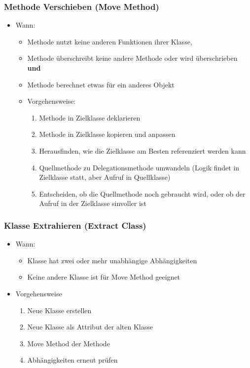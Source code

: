 \documentclass[
    ngerman,
    color=3b,
    summary,
    boxarc,
    main,
]{rubos-tuda-template}
\begin{document}
\subsubsection{Methode Verschieben (Move Method)}
\begin{itemize}
    \item Wann:\begin{itemize}
              \item Methode nutzt keine anderen Funktionen ihrer Klasse,
              \item Methode überschreibt keine andere Methode oder wird überschrieben \textbf{und}
              \item Methode berechnet etwas für ein anderes Objekt
          \end{itemize}
          \begin{itemize}
              \item Vorgehensweise:\begin{enumerate}
                        \item Methode in Zielklasse deklarieren
                        \item Methode in Zielklasse kopieren und anpassen
                        \item Herausfinden, wie die Zielklasse am Besten referenziert werden kann
                        \item Quellmethode zu Delegationsmethode umwandeln (Logik findet in Zielklasse statt, aber Aufruf in Quellklasse)
                        \item Entscheiden, ob die Quellmethode noch gebraucht wird, oder ob der Aufruf in der Zielklasse sinvoller ist
                    \end{enumerate}
          \end{itemize}
\end{itemize}
\subsubsection{Klasse Extrahieren (Extract Class)}
\begin{itemize}
    \item Wann:\begin{itemize}
              \item Klasse hat zwei oder mehr unabhängige Abhängigkeiten
              \item Keine andere Klasse ist für Move Method geeignet
          \end{itemize}
    \item Vorgehensweise\begin{enumerate}
              \item Neue Klasse erstellen
              \item Neue Klasse als Attribut der alten Klasse
              \item Move Method der Methode
              \item Abhängigkeiten erneut prüfen
          \end{enumerate}
\end{itemize}
\end{document}
